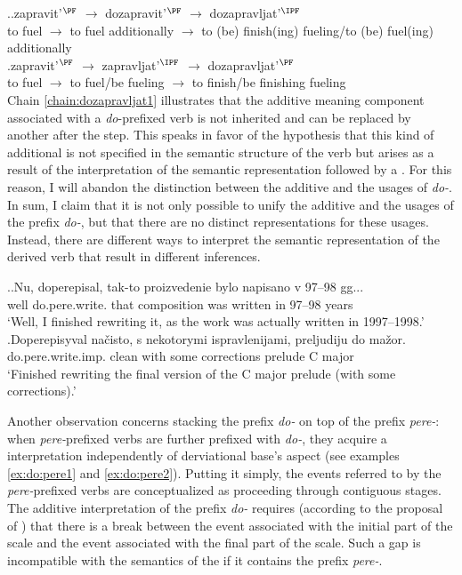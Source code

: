\ex.\label{chain:dozapravljat}\ag.\label{chain:dozapravljat1}zapravit'$^{\PF}$ $\rightarrow$ dozapravit'$^{\PF}$ $\rightarrow$ dozapravljat'$^{\IPF}$\\
{to fuel} $\rightarrow$ {to fuel additionally} $\rightarrow$ {to (be) finish(ing) fueling/to (be) fuel(ing) additionally}\\
\bg.\label{chain:dozapravljat2}zapravit'$^{\PF}$ $\rightarrow$ zapravljat'$^{\IPF}$ $\rightarrow$ dozapravljat'$^{\PF}$\\
{to fuel} $\rightarrow$ {to fuel/be fueling} $\rightarrow$ {to finish/be finishing fueling}\\

Chain \ref{chain:dozapravljat1} illustrates that the additive meaning component associated with a \textit{do}-prefixed verb is not inherited and can be replaced by another  after the  step. This speaks in favor of the hypothesis that this kind of additional  is not specified in the semantic structure of the verb but arises as a result of the interpretation of the semantic representation followed by a . For this reason, I will abandon the distinction between the additive and the  usages of \textit{do-}. In sum, I claim that it is not only possible to unify the additive and the  usages of the prefix \textit{do-}, but that there are no distinct representations for these usages. Instead, there are different ways to interpret the semantic representation of the derived verb that result in different inferences. 

\ex.\ag.\label{ex:do:pere1}Nu, doperepisal, tak-to proizvedenie bylo napisano v 97--98 gg...\\
well do.pere.write. that composition was written in 97--98 years\\
\trans `Well, I finished rewriting it, as the work was actually written in 1997--1998.'
\bg.\label{ex:do:pere2}Doperepisyval na\v{c}isto, s nekotorymi ispravlenijami, preljudiju do ma\v{z}or.\\
do.pere.write.imp. clean with some corrections prelude C major\\
\trans `Finished rewriting the final version of the C major prelude (with some corrections).'

Another observation concerns stacking the prefix \textit{do-} on top of the prefix  \textit{pere-}: when \textit{pere-}prefixed verbs are further prefixed with \textit{do-}, they acquire a  interpretation independently of derviational base's aspect (see examples \ref{ex:do:pere1} and \ref{ex:do:pere2}). Putting it simply, the events referred to by the \textit{pere-}prefixed verbs are conceptualized as proceeding through contiguous stages. The additive interpretation of the prefix \textit{do-} requires (according to the proposal of \citealt{Kagan:book}) that there is a break between the event associated with the initial part of the scale and the event associated with the final part of the scale. Such a gap is incompatible with the semantics of the  if it contains the prefix \textit{pere-}. 

